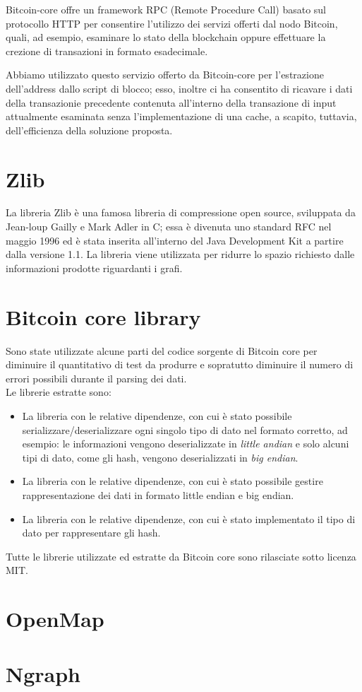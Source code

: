 Bitcoin-core offre un framework RPC (Remote Procedure Call) basato sul protocollo HTTP per consentire l'utilizzo dei servizi offerti dal nodo Bitcoin, quali, ad esempio,  esaminare lo stato della blockchain oppure effettuare la crezione di transazioni in formato esadecimale.

Abbiamo utilizzato questo servizio offerto da Bitcoin-core per l'estrazione dell'address dallo script di blocco; esso, inoltre ci ha consentito di ricavare i dati della transazionie precedente contenuta all'interno della transazione di input attualmente esaminata senza l'implementazione di una cache, a scapito, tuttavia, dell'efficienza della soluzione proposta.

\section{Zlib} \label{sec:zlib}

La libreria Zlib \cite{zlib:github} è una famosa libreria di compressione open source, sviluppata da Jean-loup Gailly e Mark Adler in C; essa è divenuta  uno standard RFC nel maggio 1996 ed è stata inserita all'interno del Java Development Kit a partire dalla versione 1.1.
La libreria viene utilizzata per ridurre lo spazio richiesto dalle informazioni prodotte riguardanti i grafi.

\section{Bitcoin core library} \label{sec:bitcoinCoreLib}

Sono state utilizzate alcune parti del codice sorgente di Bitcoin core per diminuire il quantitativo di test da produrre e sopratutto diminuire il numero di errori possibili durante il parsing dei dati.\\
Le librerie estratte sono:
\begin{itemize}
  \item La libreria  con le relative dipendenze, con cui è stato possibile serializzare/deserializzare ogni singolo tipo di dato nel formato corretto, ad esempio: le informazioni vengono deserializzate in \emph{little andian} e solo alcuni tipi di dato, come gli hash, vengono deserializzati in \emph{big endian}.
  \item La libreria  con le relative dipendenze, con cui è stato possibile gestire rappresentazione dei dati in formato little endian e big endian.
  \item La libreria  con le relative dipendenze, con cui è stato implementato il tipo di dato per rappresentare gli hash.
\end{itemize}
Tutte le librerie utilizzate ed estratte da Bitcoin core sono rilasciate sotto licenza MIT.

\section{OpenMap} \label{sec:openmap}

\section{Ngraph} \label{sec:ngraph}
